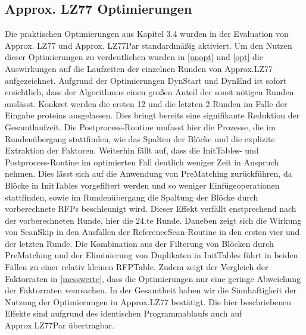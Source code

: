 \subsection{Approx. LZ77 Optimierungen}
Die praktischen Optimierungen aus Kapitel 3.4 wurden in der Evaluation von Approx. LZ77 und Approx. LZ77Par standardmäßig aktiviert. Um den Nutzen dieser Optimierungen
zu verdeutlichen wurden in \ref{unopt} und \ref{opt} die Auswirkungen auf die Laufzeiten der einzelnen Runden von Approx.LZ77 aufgezeichnet. Aufgrund der 
Optimierungen DynStart und DynEnd ist sofort ersichtlich, dass der Algorithmus einen großen Anteil der sonst nötigen Runden auslässt. Konkret werden die ersten 12 und
die letzten 2 Runden im Falle der Eingabe proteins ausgelassen. Dies bringt bereits eine signifikante Reduktion der Gesamtlaufzeit. Die Postprocess-Routine umfasst hier 
die Prozesse, die im Rundenübergang stattfinden, wie das Spalten der Blöcke und die explizite Extraktion der Faktoren.
Weiterhin fällt auf, dass die InitTables- und Postprocess-Routine im optimierten Fall deutlich weniger Zeit in Anspruch nehmen.  Dies lässt sich auf die Anwendung von 
PreMatching zurückführen, da Blöcke in InitTables vorgefiltert werden und so weniger Einfügeoperationen stattfinden, sowie im Rundenübergang die Spaltung der Blöcke 
durch vorberechnete RFPs beschleunigt wird. Dieser Effekt verfällt enstprechend nach der vorberechneten Runde, hier die 24.te Runde. Daneben zeigt sich die Wirkung von 
ScanSkip in den Ausfällen der ReferenceScan-Routine in den ersten vier und der letzten Runde. Die Kombination aus der Filterung von Blöcken durch PreMatching und der
Eliminierung von Duplikaten in InitTables führt in beiden Fällen zu einer relativ kleinen RFPTable. Zudem zeigt der Vergleich der Faktorraten in \ref{messwerte}, dass die
Optimierungen nur eine geringe Abweichung der Faktorraten veursachen. In der Gesamtheit haben wir die Sinnhaftigkeit der Nutzung der 
Optimierungen in Approx.LZ77 bestätigt. Die hier beschriebenen Effekte sind aufgrund des identischen Programmablaufs auch auf Approx.LZ77Par übertragbar.

